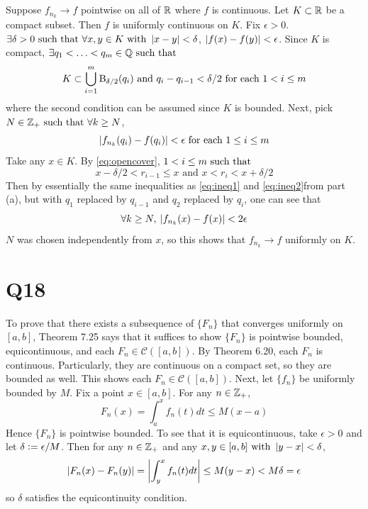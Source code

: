 \documentclass[12pt]{article}
\begin{document}
\subsection{} 
Suppose $f_{n_k} \rightarrow f$ pointwise on all of $\mathbb{R}$ where $f$ is continuous. 
Let $K \subset \mathbb{R}$ be a compact subset. 
Then $f$ is uniformly continuous on $K$.
Fix $\epsilon > 0$. 
$\exists \delta > 0 \text{ such that } \forall x, y \in K \text{ with } \left|x - y\right| < \delta$, $\left|f(x) - f(y)\right| < \epsilon$. 
Since $K$ is compact, $\exists q_1 < \ldots < q_m \in \mathbb{Q} \text{ such that }$
\begin{equation} \label{eq:opencover}
  K \subset \bigcup_{i = 1}^{m} \text{B}_{\delta / 2}(q_i) \text{ and } q_i - q_{i - 1} < \delta / 2 \text{ for each } 1 < i \leq m
\end{equation}
where the second condition can be assumed since $K$ is bounded.
Next, pick $N \in \mathbb{Z}_{+} \text{ such that } \forall k \geq N$, 
$$\left|f_{n_k}(q_i) - f(q_i)\right| < \epsilon \text{ for each } 1 \leq i \leq m$$
Take any $x \in K$. 
By \eqref{eq:opencover}, $1 < i \leq m \text{ such that }$
$$x - \delta / 2< r_{i - 1} \leq x \text{ and } x < r_{i} < x + \delta / 2$$
Then by essentially the same inequalities as \eqref{eq:ineq1} and \eqref{eq:ineq2}from part (a), but with $q_1$ replaced by $q_{i - 1}$ and $q_2$ replaced by $q_i$, one can see that 
$$\forall k \geq N, \: \left|f_{n_k}(x) - f(x)\right| < 2\epsilon$$ 
$N$ was chosen independently from $x$, so this shows that $f_{n_k} \rightarrow f$ uniformly on $K$. 

\section*{Q18}
To prove that there exists a subsequence of $\{F_n\}$ that converges uniformly on $[a, b]$, Theorem 7.25 says that it suffices to show $\{F_n\}$ is pointwise bounded, equicontinuous, and each $F_n \in \mathscr{C}([a, b])$. 
By Theorem 6.20, each $F_n$ is continuous. 
Particularly, they are continuous on a compact set, so they are bounded as well. 
This shows each $F_n \in \mathscr{C}([a, b])$. 
Next, let $\{f_n\}$ be uniformly bounded by $M$. 
Fix a point $x \in [a, b]$.
For any $n \in \mathbb{Z}_{+}$, 
$$F_n(x) = \int_{a}^{x} f_n (t) dt \leq M(x - a)$$
Hence $\{F_n\}$ is pointwise bounded.
To see that it is equicontinuous, take $\epsilon > 0$ and let $\delta \vcentcolon= \epsilon / M$. 
Then for any $n \in \mathbb{Z}_{+}$ and any $x, y \in [a, b] \text{ with } \left|y - x\right| < \delta$, 
$$\left|F_n(x) - F_n(y)\right| = \left|\int_{y}^{x} f_n(t) dt\right| \leq M(y - x) < M\delta = \epsilon$$ 
so $\delta$ satisfies the equicontinuity condition. 
\end{document}

